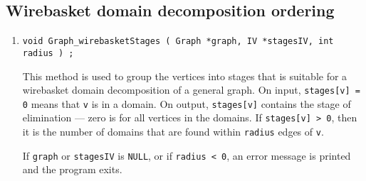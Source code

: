 \par
\subsection{Wirebasket domain decomposition ordering}
\label{subsection:Graph:proto:wirebasket}
\par
\begin{enumerate}
\item
\begin{verbatim}
void Graph_wirebasketStages ( Graph *graph, IV *stagesIV, int radius ) ;
\end{verbatim}
This method is used to group the vertices into stages that is
suitable for a wirebasket domain decomposition of a general graph.
On input, {\tt stages[v] = 0} means that {\tt v} is in a domain.
On output, {\tt stages[v]} contains the stage of elimination ---
zero is for all vertices in the domains.
If {\tt stages[v] > 0}, then it is the number of domains that 
are found within {\tt radius} edges of {\tt v}.
\par {}
If {\tt graph} or {\tt stagesIV} is {\tt NULL},
or if {\tt radius < 0},
an error message is printed and the program exits.
\end{enumerate}
\par
